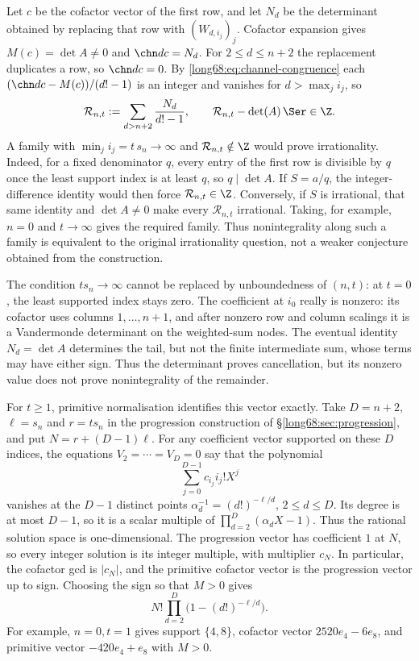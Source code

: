 Let $c$ be the cofactor vector of the first row, and let $N_d$ be the
determinant obtained by replacing that row with $(W_{d,i_j})_j$.
Cofactor expansion gives $M(c)=\det A\ne0$ and $\chn dc=N_d$.
For $2\le d\le n+2$ the replacement duplicates a row, so $\chn dc=0$.  By
\eqref{long68:eq:channel-congruence} each $(\chn dc-M(c))/(d!-1)$ is an integer and
vanishes for $d>\max_ji_j$, so
\[
 \mathcal R_{n,t}:=\sum_{d>n+2}\frac{N_d}{d!-1},\qquad
 \mathcal R_{n,t}-\det(A)\,\Ser\in\Z .
\]
A family with $\min_ji_j=t\,s_n\to\infty$ and
$\mathcal R_{n,t}\notin\Z$ would prove irrationality. Indeed, for a fixed
denominator $q$, every entry of the first row is divisible by $q$ once
the least support index is at least $q$, so $q\mid\det A$. If $S=a/q$,
the integer-difference identity would then force $\mathcal R_{n,t}\in\Z$.
Conversely, if $S$ is irrational, that same identity and $\det A\ne0$
make every $\mathcal R_{n,t}$ irrational. Taking, for example, $n=0$
and $t\to\infty$ gives the required family. Thus nonintegrality along
such a family is equivalent to the original irrationality question,
not a weaker conjecture obtained from the construction.

The condition $t s_n\to\infty$ cannot be replaced by unboundedness of
$(n,t)$: at $t=0$, the least supported index stays zero. The coefficient
at $i_0$ really is nonzero: its cofactor uses columns $1,\ldots,n+1$, and
after nonzero row and column scalings it is a Vandermonde determinant
on the weighted-sum nodes. The eventual
identity $N_d=\det A$ determines the tail, but not the finite intermediate
sum, whose terms may have either sign. Thus the determinant proves
cancellation, but its nonzero value does not prove nonintegrality of
the remainder.

For $t\ge1$, primitive normalisation identifies this vector exactly.
Take $D=n+2$, $\ell=s_n$ and $r=t s_n$ in the progression construction
of \S\ref{long68:sec:progression}, and put $N=r+(D-1)\ell$.
For any coefficient vector supported on these $D$ indices, the equations
$V_2=\cdots=V_D=0$ say that the polynomial
\[
 \sum_{j=0}^{D-1}c_{i_j}i_j!X^j
\]
vanishes at the $D-1$ distinct points
$\alpha_d^{-1}=(d!)^{-\ell/d}$, $2\le d\le D$.
Its degree is at most $D-1$, so it is a scalar multiple of
$\prod_{d=2}^D(\alpha_dX-1)$. Thus the rational solution space is
one-dimensional. The progression vector has coefficient $1$ at $N$,
so every integer solution is its integer multiple, with multiplier $c_N$.
In particular, the cofactor gcd is $|c_N|$, and the primitive cofactor
vector is the progression vector up to sign. Choosing the sign so that $M>0$ gives
\[
 N!\prod_{d=2}^D\bigl(1-(d!)^{-\ell/d}\bigr).
\]
For example, $n=0,t=1$ gives support $\{4,8\}$, cofactor vector
$2520e_4-6e_8$, and primitive vector $-420e_4+e_8$ with $M>0$.

